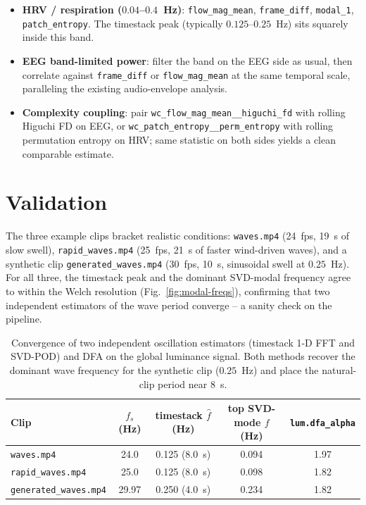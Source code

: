 \documentclass[11pt,a4paper]{article}
\newcommand{\code}[1]{\texttt{\small #1}}
\begin{document}
\begin{itemize}[leftmargin=1.5em,itemsep=0.4em]
  \item \textbf{HRV / respiration ($0.04$--$0.4$~Hz)}: \code{flow\_mag\_mean},
        \code{frame\_diff}, \code{modal\_1}, \code{patch\_entropy}. The
        timestack peak (typically $0.125$--$0.25$~Hz) sits squarely inside
        this band.
  \item \textbf{EEG band-limited power}: filter the band on the EEG side as
        usual, then correlate against \code{frame\_diff} or
        \code{flow\_mag\_mean} at the same temporal scale, paralleling the
        existing audio-envelope analysis.
  \item \textbf{Complexity coupling}: pair \code{wc\_flow\_mag\_mean\_\_higuchi\_fd}
        with rolling Higuchi FD on EEG, or
        \code{wc\_patch\_entropy\_\_perm\_entropy} with rolling permutation
        entropy on HRV; same statistic on both sides yields a clean
        comparable estimate.
\end{itemize}

\section{Validation}\label{sec:results}

The three example clips bracket realistic conditions:
\texttt{waves.mp4} (24~fps, 19~s of slow swell),
\texttt{rapid\_waves.mp4} (25~fps, 21~s of faster wind-driven waves),
and a synthetic clip \texttt{generated\_waves.mp4} (30~fps, 10~s,
sinusoidal swell at $0.25$~Hz). For all three, the timestack peak and
the dominant SVD-modal frequency agree to within the Welch resolution
(Fig.~\ref{fig:modal-freqs}), confirming that two independent estimators
of the wave period converge -- a sanity check on the pipeline.

\begin{table}[ht]
\centering
\small
\renewcommand{\arraystretch}{1.18}
\begin{tabular}{@{}lcccc@{}}
\toprule
\textbf{Clip} & $f_s$ (Hz) & timestack $\hat f$ (Hz) & top SVD-mode $f$ (Hz) & \code{lum.dfa\_alpha} \\
\midrule
\texttt{waves.mp4}            & 24.0  & 0.125 (8.0~s) & 0.094 & 1.97 \\
\texttt{rapid\_waves.mp4}     & 25.0  & 0.125 (8.0~s) & 0.098 & 1.82 \\
\texttt{generated\_waves.mp4} & 29.97 & 0.250 (4.0~s) & 0.234 & 1.82 \\
\bottomrule
\end{tabular}
\caption{Convergence of two independent oscillation estimators
(timestack 1-D FFT and SVD-POD) and DFA on the global luminance signal.
Both methods recover the dominant wave frequency for the synthetic clip
($0.25$~Hz) and place the natural-clip period near $8$~s.}
\label{tab:val}
\end{table}
\end{document}
